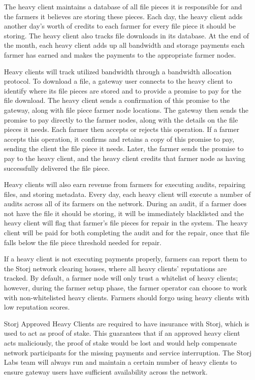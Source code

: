 \documentclass[a4paper,10pt]{article} \usepackage[utf8]{inputenc}
\begin{document}
The heavy client maintains a database of all file pieces it is responsible for
and the farmers it believes are storing these pieces. Each day, the heavy
client adds another day’s worth of credits to each farmer for every file piece
it should be storing. The heavy client
also tracks file downloads in its database. 
At the end of the month, each heavy client
adds up all bandwidth and storage payments each farmer has earned and makes
the payments to the appropriate farmer nodes.

Heavy clients will track utilized bandwidth through a bandwidth allocation
protocol. To download a file, a gateway user connects to the heavy client to
identify where its file pieces are stored and to provide a promise to pay for
the file download. The heavy client sends a confirmation of this promise 
to the gateway, along with file piece farmer node locations. 
The gateway then sends the promise to pay directly
to the farmer nodes, along with the details on the file pieces it needs. 
Each farmer then accepts or rejects this operation. 
If a farmer accepts this
operation, it confirms and retains a copy of this promise to pay, sending the
client the file piece it needs. Later, the farmer sends the promise to pay to
the heavy client, and the heavy client credits that farmer node as having
successfully delivered the file piece.

Heavy clients will also earn revenue from farmers for executing audits,
repairing files, and storing metadata. Every day, each heavy client will execute
a number of audits across all of its farmers on the network. During an audit,
if a farmer does not have the file it should be storing, it will be immediately
blacklisted and the heavy client will flag that farmer’s file pieces for repair
in the system. 
The heavy client will be paid for both completing the audit 
and for the repair, 
once that file falls below the file piece threshold needed for
repair.

If a heavy client is not executing payments properly, farmers can report them
to the Storj network clearing houses, where all heavy clients’ reputations are
tracked. By default, a farmer node will only trust a whitelist of heavy
clients; however, during the farmer setup phase, the farmer operator can choose
to work with non-whitelisted heavy clients. 
Farmers should forgo using heavy clients with low reputation scores.

Storj Approved Heavy Clients are required to have insurance with Storj, 
which is used to act as proof of stake. 
This guarantees that if an approved heavy client acts maliciously, 
the proof of stake would
be lost and would help compensate network participants for the missing payments
and service interruption. The Storj Labs team will always run and maintain a
certain number of heavy clients to ensure gateway users have sufficient
availability across the network.
\end{document}
